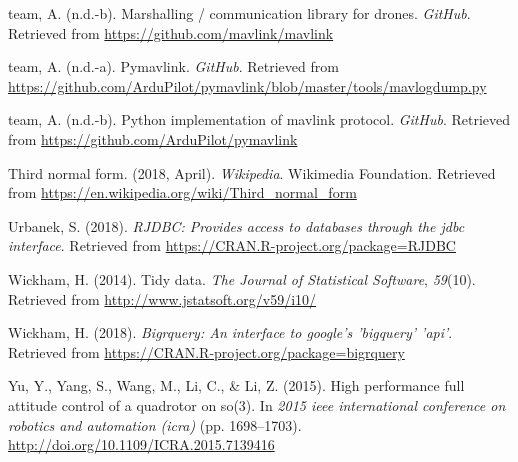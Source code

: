 \documentclass[12pt,oneside]{reedthesis}
\theoremstyle{definition}
\theoremstyle{definition}
\theoremstyle{definition}
\theoremstyle{remark}
\begin{document}
\hypertarget{ref-mavlink}{}
team, A. (n.d.-b). Marshalling / communication library for drones.
\emph{GitHub}. Retrieved from \url{https://github.com/mavlink/mavlink}

\hypertarget{ref-pydump}{}
team, A. (n.d.-a). Pymavlink. \emph{GitHub}. Retrieved from
\url{https://github.com/ArduPilot/pymavlink/blob/master/tools/mavlogdump.py}

\hypertarget{ref-pymav}{}
team, A. (n.d.-b). Python implementation of mavlink protocol.
\emph{GitHub}. Retrieved from
\url{https://github.com/ArduPilot/pymavlink}

\hypertarget{ref-3fn}{}
Third normal form. (2018, April). \emph{Wikipedia}. Wikimedia
Foundation. Retrieved from
\url{https://en.wikipedia.org/wiki/Third_normal_form}

\hypertarget{ref-3}{}
Urbanek, S. (2018). \emph{RJDBC: Provides access to databases through
the jdbc interface}. Retrieved from
\url{https://CRAN.R-project.org/package=RJDBC}

\hypertarget{ref-tidy-data}{}
Wickham, H. (2014). Tidy data. \emph{The Journal of Statistical
Software}, \emph{59}(10). Retrieved from
\url{http://www.jstatsoft.org/v59/i10/}

\hypertarget{ref-4}{}
Wickham, H. (2018). \emph{Bigrquery: An interface to google's 'bigquery'
'api'}. Retrieved from
\url{https://CRAN.R-project.org/package=bigrquery}

\hypertarget{ref-pid}{}
Yu, Y., Yang, S., Wang, M., Li, C., \& Li, Z. (2015). High performance
full attitude control of a quadrotor on so(3). In \emph{2015 ieee
international conference on robotics and automation (icra)} (pp.
1698--1703). \url{http://doi.org/10.1109/ICRA.2015.7139416}


\end{document}
